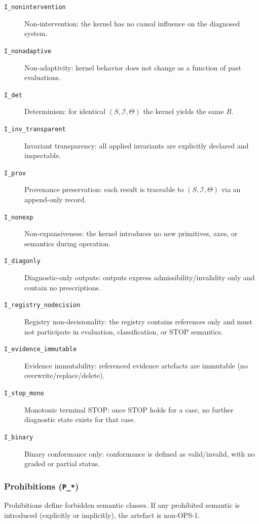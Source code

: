 \begin{description}
  \item[\texttt{I\_nonintervention}] Non-intervention:
    the kernel has no causal influence on the diagnosed system.
  \item[\texttt{I\_nonadaptive}] Non-adaptivity:
    kernel behavior does not change as a function of past evaluations.
  \item[\texttt{I\_det}] Determinism:
    for identical $(S,\mathcal{I},\Theta)$ the kernel yields the same $R$.
  \item[\texttt{I\_inv\_transparent}] Invariant transparency:
    all applied invariants are explicitly declared and inspectable.
  \item[\texttt{I\_prov}] Provenance preservation:
    each result is traceable to $(S,\mathcal{I},\Theta)$ via an append-only record.
  \item[\texttt{I\_nonexp}] Non-expansiveness:
    the kernel introduces no new primitives, axes, or semantics during operation.
  \item[\texttt{I\_diagonly}] Diagnostic-only outputs:
    outputs express admissibility/invalidity only and contain no prescriptions.
  \item[\texttt{I\_registry\_nodecision}] Registry non-decisionality:
    the registry contains references only and must not participate in evaluation,
    classification, or STOP semantics.
  \item[\texttt{I\_evidence\_immutable}] Evidence immutability:
    referenced evidence artefacts are immutable (no overwrite/replace/delete).
  \item[\texttt{I\_stop\_mono}] Monotonic terminal STOP:
    once STOP holds for a case, no further diagnostic state exists for that case.
  \item[\texttt{I\_binary}] Binary conformance only:
    conformance is defined as valid/invalid, with no graded or partial status.
\end{description}

\subsubsection{Prohibitions (\texttt{P\_*})}

Prohibitions define forbidden semantic classes. If any prohibited semantic is
introduced (explicitly or implicitly), the artefact is non-OPS-1.

